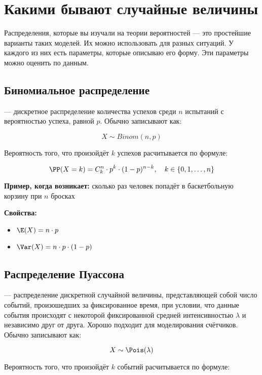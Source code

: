 \section{Какими бывают случайные величины}

Распределения, которые вы изучали на теории вероятностей --- это простейшие варианты таких моделей. Их можно использовать для разных ситуаций. У каждого из них есть параметры, которые описываю его форму. Эти параметры можно оценить по данным. 

\subsection*{Биномиальное распределение}

 --- дискретное распределение количества успехов среди $n$ испытаний с вероятностью успеха, равной $p$. Обычно записывают как:

$$
X \sim Binom(n, p)
$$

Вероятность того, что произойдёт $k$ успехов расчитывается по формуле: 

$$
\PP(X = k) = {C}^n_k \cdot p^k \cdot (1 - p)^{n - k}, \quad k \in \{0, 1, \ldots, n\}
$$

\textbf{Пример, когда возникает:} сколько раз человек попадёт в баскетбольную корзину при $n$ бросках 

\textbf{Свойства:}

\begin{itemize} 
\item $\E(X) = n \cdot p$
\item $\Var(X) = n \cdot p \cdot (1 - p)$
\end{itemize} 


\subsection*{Распределение Пуассона}

 --- распределение дискретной случайной величины, представляющей собой число событий, произошедших за фиксированное время, при условии, что данные события происходят с некоторой фиксированной средней интенсивностью $\lambda$ и независимо друг от друга. Хорошо подходит для моделирования счётчиков. Обычно записывают как:

$$
X \sim \Pois(\lambda)
$$

Вероятность того, что произойдёт $k$ событий расчитывается по формуле: 

